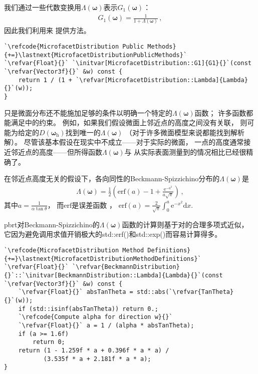 我们通过一些代数变换用$\Lambda({\bm\omega})$表示$G_1({\bm\omega})$：
\begin{align*}
    G_1({\bm\omega})=\frac{1}{1+\Lambda({\bm\omega})}\, ,
\end{align*}
因此我们利用来
提供方法。
\begin{lstlisting}
`\refcode{MicrofacetDistribution Public Methods}{+=}\lastnext{MicrofacetDistributionPublicMethods}`
`\refvar{Float}{}` `\initvar[MicrofacetDistribution::G1]{G1}{}`(const `\refvar{Vector3f}{}` &w) const {
    return 1 / (1 + `\refvar[MicrofacetDistribution::Lambda]{Lambda}{}`(w));
}
\end{lstlisting}

只是微面分布还不能施加足够的条件以明确一个特定的$\Lambda({\bm\omega})$函数；
许多函数都能满足中的约束。
例如，如果我们假设微面上邻近点的高度之间没有关联，
则可能为给定的$D({\bm\omega}_{\mathrm{h}})$找到唯一的$\Lambda({\bm\omega})$
（对于许多微面模型来说都能找到解析解）。
尽管该基本假设在现实中不成立——对于实际的微面，
一点的高度通常接近邻近点的高度——但所得函数$\Lambda({\bm\omega})$与
从实际表面测量到的情况相比已经很精确了。

在邻近点高度无关的假设下，各向同性的Beckmann-Spizzichino分布的$\Lambda({\bm\omega})$是
\begin{align}\label{eq:8.14}
    \Lambda({\bm\omega})=\frac{1}{2}\left(\mathrm{erf}(a)-1+\frac{\mathrm{e}^{-a^2}}{a\sqrt{\pi}}\right)\, ,
\end{align}
其中$a=\displaystyle\frac{1}{\alpha\tan\theta}$，
而$\mathrm{erf}$是误差函数
，
$\displaystyle\mathrm{erf}(a)=\frac{2}{\sqrt{\pi}}\int_0^a\mathrm{e}^{-x^2}\mathrm{d}x$.

pbrt对Beckmann-Spizzichino的$\Lambda({\bm\omega})$函数的计算则基于对的合理多项式近似，
它因为避免调用求值开销极大的{\ttfamily std::erf()}和{\ttfamily std::exp()}而容易计算得多。
\begin{lstlisting}
`\refcode{MicrofacetDistribution Method Definitions}{+=}\lastnext{MicrofacetDistributionMethodDefinitions}`
`\refvar{Float}{}` `\refvar{BeckmannDistribution}{}`::`\initvar[BeckmannDistribution::Lambda]{Lambda}{}`(const `\refvar{Vector3f}{}` &w) const {
    `\refvar{Float}{}` absTanTheta = std::abs(`\refvar{TanTheta}{}`(w));
    if (std::isinf(absTanTheta)) return 0.;
    `\refcode{Compute alpha for direction w}{}`
    `\refvar{Float}{}` a = 1 / (alpha * absTanTheta);
    if (a >= 1.6f)
        return 0;
    return (1 - 1.259f * a + 0.396f * a * a) /
           (3.535f * a + 2.181f * a * a);
}
\end{lstlisting}

